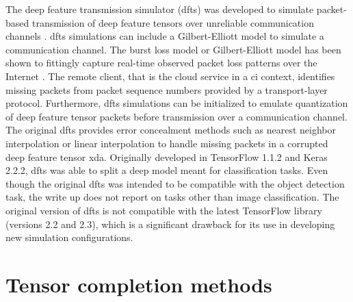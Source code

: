 The deep feature transmission simulator (\gls{dfts}) was developed to simulate packet-based transmission of deep feature tensors over unreliable communication channels \cite{unnibhavi2018dfts}. \gls{dfts} simulations can include a Gilbert-Elliott model to simulate a communication channel. The burst loss model or Gilbert-Elliott model has been shown to fittingly capture real-time observed packet loss patterns over the Internet \cite{5755057}. The remote client, that is the cloud service in a \gls{ci} context, identifies missing packets from packet sequence numbers provided by a transport-layer protocol. Furthermore, \gls{dfts} simulations can be initialized to emulate quantization of deep feature tensor packets before transmission over a communication channel. The original \gls{dfts} provides error concealment methods such as nearest neighbor interpolation or linear interpolation to handle missing packets in a corrupted deep feature tensor \gls{xda}. Originally developed in TensorFlow 1.1.2 and Keras 2.2.2, \gls{dfts} was able to split a deep model meant for classification tasks. Even though the original \gls{dfts} was intended to be compatible with the object detection task, the write up \cite{unnibhavi2018dfts} does not report on tasks other than image classification. The original version of \gls{dfts} is not compatible with the latest TensorFlow library (versions 2.2 and 2.3), which is a significant drawback for its use in developing new simulation configurations.

\section{Tensor completion methods} \label{sec:background:tc}

